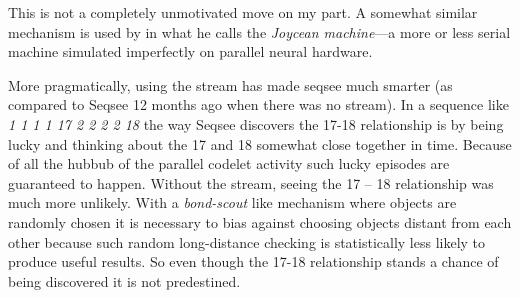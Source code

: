 This is not a completely unmotivated move on my part.  A somewhat similar mechanism is used by  in what he calls the \emph{Joycean machine}---a more or less serial machine simulated imperfectly on parallel neural hardware.

More pragmatically, using the stream has made seqsee much smarter (as compared to Seqsee 12 months ago when there was no stream).  In a sequence like \emph{1 1 1 1 17 2 2 2 2 18} the way Seqsee discovers the 17-18 relationship is by being lucky and thinking about the 17 and 18 somewhat close together in time.  Because of all the hubbub of the parallel codelet activity such lucky episodes are guaranteed to happen.  Without the stream, seeing the 17 -- 18 relationship was much more unlikely.  With a \emph{bond-scout} like mechanism where objects are randomly chosen it is necessary to bias against choosing objects distant from each other because such random long-distance checking is statistically less likely to produce useful results.  So even though the 17-18 relationship stands a chance of being discovered it is not predestined.

